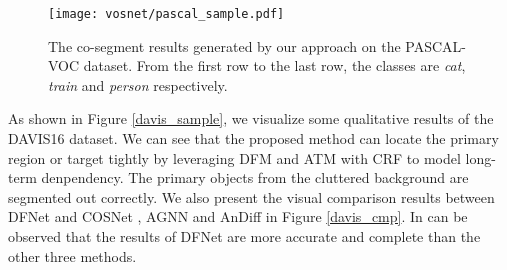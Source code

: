 \documentclass[runningheads]{llncs}
\begin{document}
\begin{table*}[t!]
	\caption{The performance of object co-segmentation on the PASCAL-VOC dataset under Jaccard index and Precision.  The numbers in red and green respectively indicate the best and the second best results. }
	\label{vos_voc}
\end{table*}
\begin{figure*}[t!]
	\centering
	\texttt{[image: vosnet/pascal\_sample.pdf]}
	\caption{The co-segment results generated by our approach on the PASCAL-VOC dataset. From the first row to the last row, the
		classes are \emph{cat}, \emph{train} and \emph{person} respectively.}
	\label{pascal_sample}
\end{figure*}
\indent As shown in Figure \ref{davis_sample}, we visualize some qualitative results of the DAVIS16 dataset. We can see that the proposed
method can locate the primary region or target tightly by leveraging DFM and ATM with CRF to model long-term denpendency. The primary objects from the cluttered background are segmented out correctly. We also present the visual comparison results between DFNet and COSNet \cite{vos_cosnet}, AGNN \cite{vos_agnn} and AnDiff \cite{vos_andiff} in Figure \ref{davis_cmp}. In can be observed that the results of DFNet are more accurate and complete than the other three methods.
\end{document}
